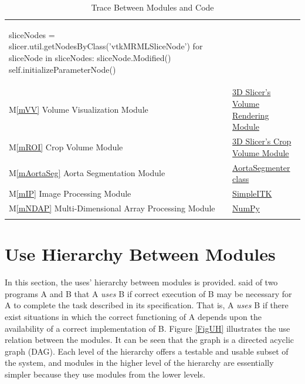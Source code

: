 \documentclass[12pt, titlepage]{article}
\newcommand{\mref}[1]{M\ref{#1}}
\begin{document}
\begin{longtable}[H]{p{} p{} p{}}
\begin{python}
        sliceNodes = slicer.util.getNodesByClass('vtkMRMLSliceNode')
        for sliceNode in sliceNodes:
            sliceNode.Modified()
        self.initializeParameterNode()
\end{python}
\\
\multicolumn{2}{p{0.2\textwidth}}{\mref{mVV} Volume Visualization Module} & {\href{https://slicer.readthedocs.io/en/latest/user_guide/modules/volumerendering.html}{3D Slicer's Volume Rendering Module}}\\
\multicolumn{2}{p{0.2\textwidth}}{\mref{mROI} Crop Volume Module} &  {\href{https://slicer.readthedocs.io/en/latest/user_guide/modules/cropvolume.html}{3D Slicer's Crop Volume Module}} \\
\multicolumn{2}{p{0.2\textwidth}}{\mref{mAortaSeg} Aorta Segmentation Module} & \href{https://github.com/smiths/aorta/blob/main/src/SlicerExtension/AortaGeometryReconstructor/AortaGeomReconDisplayModule/AortaGeomReconDisplayModuleLib/AortaSegmenter.py}{AortaSegmenter class}\\
\multicolumn{2}{p{0.2\textwidth}}{\mref{mIP} Image Processing Module} &   \href{https://simpleitk.org/}{SimpleITK} \\
\multicolumn{2}{p{0.2\textwidth}}{\mref{mNDAP} Multi-Dimensional Array Processing Module} & \href{https://numpy.org/}{NumPy}\\
\bottomrule
\caption{Trace Between Modules and Code}
\label{TblTC}
\end{longtable}

\newpage

\section{Use Hierarchy Between Modules} \label{SecUse}

In this section, the uses' hierarchy between modules is
provided. \citet{Parnas1978} said of two programs A and B that A {\em uses} B if
correct execution of B may be necessary for A to complete the task described in
its specification. That is, A {\em uses} B if there exist situations in which
the correct functioning of A depends upon the availability of a correct
implementation of B.  Figure \ref{FigUH} illustrates the use relation between
the modules. It can be seen that the graph is a directed acyclic graph
(DAG). Each level of the hierarchy offers a testable and usable subset of the
system, and modules in the higher level of the hierarchy are essentially simpler
because they use modules from the lower levels.
\end{document}
